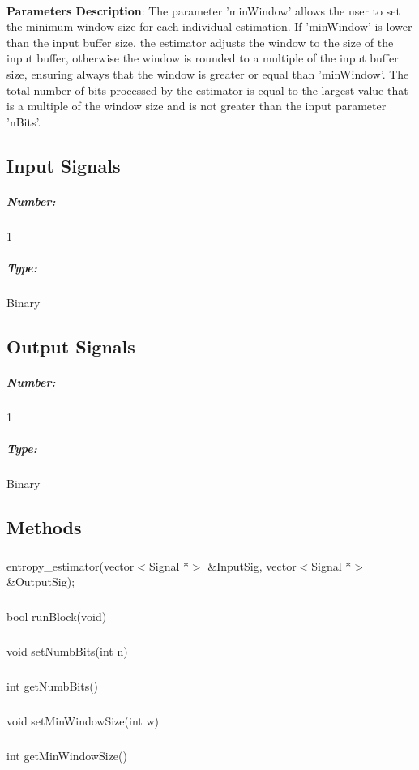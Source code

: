 \paragraph{}
\textbf{Parameters Description}: The parameter 'minWindow' allows the user to set the 
minimum window size for each individual estimation. If 'minWindow' is lower than the 
input buffer size, the estimator adjusts the window to the size of the input buffer, 
otherwise the window is rounded to a multiple of the input buffer size, ensuring always 
that the window is greater or equal than 'minWindow'. The total number of bits processed 
by the estimator is equal to the largest value that is a multiple of the window size and 
is not greater than the input parameter 'nBits'.

\subsection*{Input Signals}
\subparagraph*{Number:} 1
\subparagraph*{Type:} Binary

\subsection*{Output Signals}
\subparagraph*{Number:} 1
\subparagraph*{Type:} Binary
\paragraph{}

\subsection*{Methods}
\subparagraph*{}
entropy\_estimator(vector$<$Signal *$>$ \&InputSig, vector$<$Signal *$>$ \&OutputSig);
\subparagraph*{}
bool runBlock(void)
\subparagraph*{}
void setNumbBits(int n)
\subparagraph*{}
int getNumbBits()
\subparagraph*{}
void setMinWindowSize(int w)
\subparagraph*{}
int getMinWindowSize()